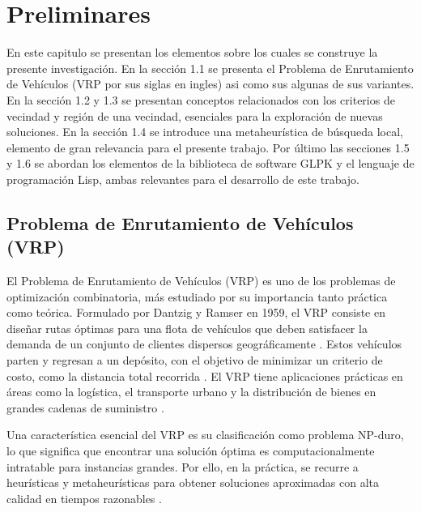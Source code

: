 \documentclass{article}
\begin{document}
\section{Preliminares}
En este capitulo se presentan los elementos sobre los cuales se construye la presente investigación. En la sección 1.1 se presenta el Problema de Enrutamiento de Vehículos (VRP por sus siglas en ingles) asi como sus algunas de sus variantes. En la sección 1.2 y 1.3 se presentan conceptos relacionados con los criterios de vecindad y región de una vecindad, esenciales para la exploración de nuevas soluciones. En la sección 1.4 se introduce una metaheurística de búsqueda local, elemento de gran relevancia para el presente trabajo. Por último las secciones 1.5 y 1.6  se abordan los elementos de la biblioteca de software GLPK y el lenguaje de programación Lisp, ambas relevantes para el desarrollo de este trabajo. 
\subsection{Problema de Enrutamiento de Vehículos (VRP)}
El Problema de Enrutamiento de Vehículos (VRP) es uno de los problemas de optimización combinatoria,  más estudiado por su importancia tanto práctica como teórica. Formulado por Dantzig y Ramser en 1959, el VRP consiste en diseñar rutas óptimas para una flota de vehículos que deben satisfacer la demanda de un conjunto de clientes dispersos geográficamente \cite{ref2}. Estos vehículos parten y regresan a un depósito, con el objetivo de minimizar un criterio de costo, como la distancia total recorrida \cite{ref3}. El VRP tiene aplicaciones prácticas en áreas como la logística, el transporte urbano y la distribución de bienes en grandes cadenas de suministro \cite{ref8,ref10,ref11}.

Una característica esencial del VRP es su clasificación como problema NP-duro, lo que significa que encontrar una solución óptima es computacionalmente intratable para instancias grandes. Por ello, en la práctica, se recurre a heurísticas y metaheurísticas para obtener soluciones aproximadas con alta calidad en tiempos razonables \cite{ref7}.
\end{document}
